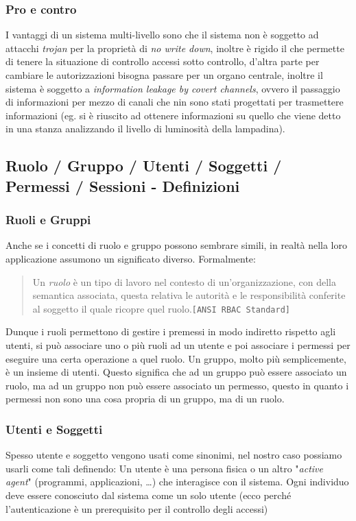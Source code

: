         \subsubsection{Pro e contro}
            I vantaggi di un sistema multi-livello sono che il sistema non è soggetto ad attacchi \textit{trojan} per la proprietà di \textit{no write down}, inoltre è rigido il che permette di tenere la situazione di controllo accessi sotto controllo, d'altra parte per cambiare le autorizzazioni bisogna passare per un organo centrale, inoltre il sistema è soggetto a \textit{information leakage by covert channels}, ovvero il passaggio di informazioni per mezzo di canali che nin sono stati progettati per trasmettere informazioni (eg. si è riuscito ad ottenere informazioni su quello che viene detto in una stanza analizzando il livello di luminosità della lampadina).
    \subsection{Ruolo / Gruppo / Utenti / Soggetti / Permessi / Sessioni - Definizioni}
        \subsubsection{Ruoli e Gruppi}
            Anche se i concetti di ruolo e gruppo possono sembrare simili, in realtà nella loro applicazione assumono un significato diverso. Formalmente:
            \begin{quote}
                Un \textit{ruolo} è un tipo di lavoro nel contesto di un'organizzazione, con della semantica associata, questa relativa le autorità e le responsibilità conferite al soggetto il quale ricopre quel ruolo.\texttt{[ANSI RBAC Standard]}
            \end{quote}
            Dunque i ruoli permettono di gestire i premessi in modo indiretto rispetto agli utenti, si può associare uno o più ruoli ad un utente e poi associare i permessi per eseguire una certa operazione a quel ruolo.\newline
            Un gruppo, molto più semplicemente, è un insieme di utenti.\newline
            Questo significa che ad un gruppo può essere associato un ruolo, ma ad un gruppo non può essere associato un permesso, questo in quanto i permessi non sono una cosa propria di un gruppo, ma di un ruolo.
        \subsubsection{Utenti e Soggetti}
            Spesso utente e soggetto vengono usati come sinonimi, nel nostro caso possiamo usarli come tali definendo:\newline
            Un utente è una persona fisica o un altro "\textit{active agent}" (programmi, applicazioni, \dots) che interagisce con il sistema. Ogni individuo deve essere conosciuto dal sistema come un solo utente (ecco perché l'autenticazione è un prerequisito per il controllo degli accessi)
